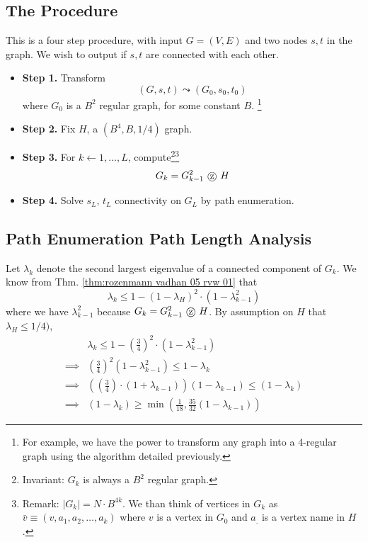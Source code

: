 \subsection{The Procedure}
\vspace{1em}
\begin{algorithm}
This is a four step procedure, with input $G = (V, E)$ and two nodes $s, t$ in the graph. We wish to output if $s, t$ are connected with each other. 

\begin{itemize}
	\item \textbf{Step 1.} Transform 
		\begin{equation}
			(G, s, t) \leadsto (G_0, s_0, t_0)
		\end{equation}
		where $G_0$ is a $B^2$ regular graph, for some constant $B$. \footnote{For example, we have the power to transform any graph into a 4-regular graph using the algorithm detailed previously.}
	\item \textbf{Step 2.} Fix $H$, a $(B^4, B, 1/4)$ graph. 
	\item \textbf{Step 3.} For $k \gets 1, \dots, L$, compute\footnote{Invariant: $G_k$ is always a $B^2$ regular graph. }\footnote{Remark: $|G_k| = N \cdot B^{4k}$. We than think of vertices in $G_k$ as $\bar v \equiv (v, a_1, a_2, \dots, a_k)$ where $v$ is a vertex in $G_0$ and $a_.$ is a vertex name in $H$. }
		\begin{equation}
			G_k = G_{k - 1}^2 \tcircle{z} H
		\end{equation}
	\item \textbf{Step 4.} Solve $s_{L}$, $t_{L}$ connectivity on $G_L$ by path enumeration.  
\end{itemize}	
\end{algorithm}

\subsection{Path Enumeration Path Length Analysis}
Let $\lambda_k$ denote the second largest eigenvalue of a connected component of $G_k$. We know from Thm. \ref{thm:rozenmann vadhan 05 rvw 01} that 
\begin{equation}
	\lambda_k \leq 1 - (1 - \lambda_H) ^ 2 \cdot ( 1- \lambda_{k - 1} ^2 ) 
\end{equation}
where we have $\lambda_{k - 1} ^2$ because $G_k = G_{k - 1}^2 \tcircle{z} H$. By assumption on $H$ that $\lambda_H \leq 1/4)$, 
\begin{align}
	&\lambda_k \leq 1 - \left( \frac{3}{4} \right) ^ 2 \cdot (1 - \lambda_{k - 1}^2 ) \\
	\implies & \left( \frac{3}{4} \right) ^ 2 ( 1 - \lambda_{k - 1}^2 ) \leq 1 - \lambda_k \\
	\implies & \left( \left ( \frac{3}{4} \right) \cdot ( 1 + \lambda_{k - 1} ) \right) ( 1 - \lambda_{k - 1} )  \leq (1 - \lambda_k) \\
	\implies & (1 - \lambda_k) \geq \min \left( \frac{1}{18}, \frac{35}{32} ( 1 - \lambda_{k - 1} ) \right )
\end{align}


